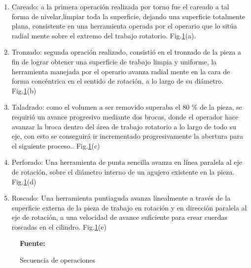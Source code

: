 \begin{enumerate}
\renewcommand{\theenumi}{\alph{enumi}} %
     \item Careado: a la primera operaci\'on realizada por torno fue el careado a tal forma de nivelar,limpiar toda la superficie, dejando una superficie totalmente plana, consistente en una herramienta operada por el operario que lo sit\'ua radial mente sobre el extremo del trabajo rotatorio. Fig.\ref{fig:torneado}(a).
    \item Tronzado: segunda opraci\'on realizado, consisti\'o en el tronzado de la pieza a fin de lograr obtener una superficie de trabajo limpia y uniforme, la herramienta manejada por el operario avanza radial mente en la cara de forma conc\'entrica en el sentido de rotaci\'on, a lo largo de su di\'ametro. Fig.\ref{fig:torneado}(b) 
    \item Taladrado: como el volumen  a ser removido superaba el 80 {\%} de la pieza, se requirió un avance progresivo mediante dos brocas, donde el operador hace avanzar la broca dentro del \'area de trabajo rotatorio a lo largo de todo su eje, con esto se conseguir\'a ir incrementado progresivamente la abertura para el siguiente proceso.. Fig.\ref{fig:torneado}(c)
    \item Perforado: Una herramienta de punta sencilla avanza en línea paralela al eje de rotación, sobre el diámetro interno de un agujero existente en la pieza. Fig.\ref{fig:torneado}(d)
    \item Roscado: Una herramienta puntiaguda avanza linealmente a través de la superficie externa de la pieza de trabajo en rotación y en dirección paralela al eje de rotación, a una velocidad de avance suficiente para crear cuerdas roscadas en el cilindro. Fig.\ref{fig:torneado}(e)
\end{enumerate}
\begin{figure}[H]
\centering
{}
\caption{Secuencia de operaciones}{\textbf{ Fuente:}\cite{groover_fundamentos_1997}}
\label{fig:torneado}
\end{figure}


